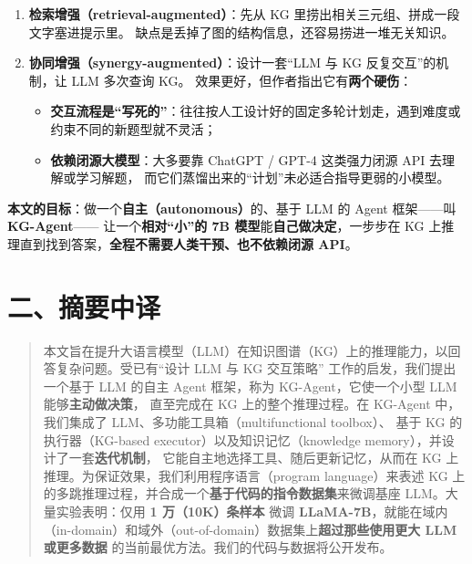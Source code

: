 \documentclass[11pt,UTF8,fontset=fandol]{ctexart}
\begin{document}
\begin{enumerate}[leftmargin=2em]
  \item \textbf{检索增强（retrieval-augmented）}：先从 KG 里捞出相关三元组、拼成一段文字塞进提示里。
        缺点是丢掉了图的结构信息，还容易捞进一堆无关知识。
  \item \textbf{协同增强（synergy-augmented）}：设计一套“LLM 与 KG 反复交互”的机制，让 LLM 多次查询 KG。
        效果更好，但作者指出它有\textbf{两个硬伤}：
        \begin{itemize}[leftmargin=1.5em]
          \item \textbf{交互流程是“写死的”}：往往按人工设计好的固定多轮计划走，遇到难度或约束不同的新题型就不灵活；
          \item \textbf{依赖闭源大模型}：大多要靠 ChatGPT / GPT-4 这类强力闭源 API 去理解或学习解题，
                而它们蒸馏出来的“计划”未必适合指导更弱的小模型。
        \end{itemize}
\end{enumerate}

\textbf{本文的目标}：做一个\textbf{自主（autonomous）}的、基于 LLM 的 Agent 框架——叫 \textbf{KG-Agent}——
让一个\textbf{相对“小”的 7B 模型}能\textbf{自己做决定}，一步步在 KG 上推理直到找到答案，\textbf{全程不需要人类干预、也不依赖闭源 API}。

\section{二、摘要中译}

\begin{quote}
本文旨在提升大语言模型（LLM）在知识图谱（KG）上的推理能力，以回答复杂问题。受已有“设计 LLM 与 KG 交互策略”
工作的启发，我们提出一个基于 LLM 的自主 Agent 框架，称为 KG-Agent，它使一个小型 LLM 能够\textbf{主动做决策}，
直至完成在 KG 上的整个推理过程。在 KG-Agent 中，我们集成了 LLM、多功能工具箱（multifunctional toolbox）、
基于 KG 的执行器（KG-based executor）以及知识记忆（knowledge memory），并设计了一套\textbf{迭代机制}，
它能自主地选择工具、随后更新记忆，从而在 KG 上推理。为保证效果，我们利用程序语言（program language）来表述
KG 上的多跳推理过程，并合成一个\textbf{基于代码的指令数据集}来微调基座 LLM。大量实验表明：仅用 \textbf{1 万（10K）条样本}
微调 \textbf{LLaMA-7B}，就能在域内（in-domain）和域外（out-of-domain）数据集上\textbf{超过那些使用更大 LLM 或更多数据}
的当前最优方法。我们的代码与数据将公开发布。
\end{quote}
\end{document}
